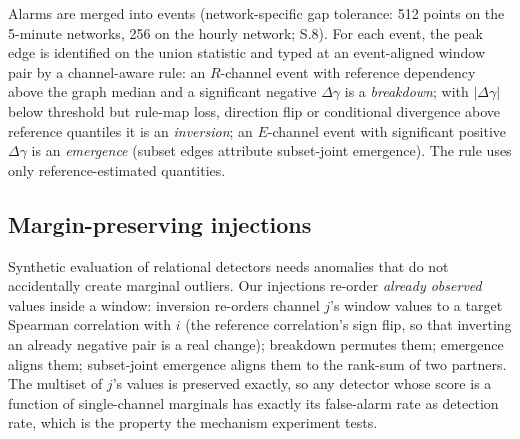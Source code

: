 \documentclass[11pt,a4paper]{article}
\begin{document}
Alarms are merged into events (network-specific gap tolerance: 512 points
on the 5-minute networks, 256 on the hourly network; S.8). For each event, the
peak edge is identified on the union statistic and typed at an event-aligned
window pair by a channel-aware rule: an $R$-channel event with reference
dependency above the graph median and a significant negative
$\Delta\gamma$ is a \emph{breakdown}; with $|\Delta\gamma|$ below threshold
but rule-map loss, direction flip or conditional divergence above reference
quantiles it is an \emph{inversion}; an $E$-channel event with significant
positive $\Delta\gamma$ is an \emph{emergence} (subset edges attribute
subset-joint emergence). The rule uses only reference-estimated quantities.

\subsection{Margin-preserving injections}\label{sec:inject}

Synthetic evaluation of relational detectors needs anomalies that do not
accidentally create marginal outliers. Our injections re-order \emph{already
observed} values inside a window: inversion re-orders channel $j$'s window
values to a target Spearman correlation with $i$ (the reference correlation's
sign flip, so that inverting an already negative pair is a real change);
breakdown permutes them; emergence aligns them; subset-joint emergence aligns
them to the rank-sum of two partners. The multiset of $j$'s values is
preserved exactly, so any detector whose score is a function of single-channel
marginals has exactly its false-alarm rate as detection rate, which is the
property the mechanism experiment tests.
\end{document}
